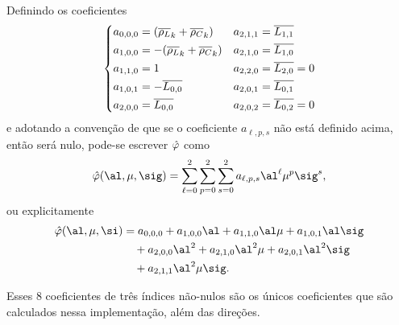 Definindo os coeficientes \[ \left\{
\begin{aligned}
a_{0,0,0} &= (\overline{\rho_L}_k + \overline{\rho_C}_k)     & a_{2,1,1} &=
\overline{L_{1,1}}\\
a_{1,0,0} &= - (\overline{\rho_L}_k + \overline{\rho_C}_k)   & a_{2,1,0} &=
\overline{L_{1,0}}\\
a_{1,1,0} &= 1 				    & a_{2,2,0} &= \overline{L_{2,0}}=0\\
a_{1,0,1} &= -  \overline{L_{0,0}} & a_{2,0,1} &= \overline{L_{0,1}}\\
a_{2,0,0} &=  \overline{L_{0,0}} & a_{2,0,2} &= \overline{L_{0,2}}=0\\
\end{aligned}\right.	
\]
e adotando a convenção de que se o coeficiente  $a_{\ell,p,s}$ não está definido
acima, então será nulo, pode-se escrever $\hat{\varphi}$ como
\[
\nextphi(\al,\mu,\sig) = \sum_{\ell= 0}^2\sum_{p=0}^2 
\sum_{s=0}^2a_{\ell,p,s}\al^\ell\mu^p\sig^s,
\]   
ou explicitamente
\begin{equation}
\begin{aligned}
\nextphi(\al,\mu,\si) & = 	a_{0,0,0} + a_{1,0,0}\al + a_{1,1,0}\al\mu + 
a_{1,0,1}\al\sig  
\\
&\quad + a_{2,0,0}\al^2
 + a_{2,1,0}\al^2\mu   + a_{2,0,1}\al^2\sig\\ 
& \quad + a_{2,1,1}\al^2\mu\sig.
\end{aligned}
\label{eq:varphi-poly-form}
\end{equation}

Esses 8 
coeficientes de três índices  não-nulos são
os únicos coeficientes que são calculados nessa implementação, além das
direções.

% 



